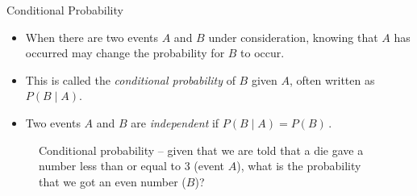 \documentclass[serif,envcountsect,table,t%
]{beamer}%
\begin{document}
\begin{frame}{Conditional Probability}
  \begin{itemize}
  \item When there are two events $A$ and $B$ under consideration, knowing that
    $A$ has occurred may change the probability for $B$ to occur.
  \item This is called the \emph{conditional probability} of $B$ given $A$,
    often written as $P(B\mid A)$.
  \item Two events $A$ and $B$ are \emph{independent} if $P(B\mid A) = P(B)\,.$
\end{itemize}
   


\begin{figure}[htbp]
\centering
{}
\caption{Conditional probability -- given that we are told that a die gave a number less than or equal to 3 (event $A$), what is the probability that we got an even number ($B$)?}
\label{fig:probability-conditional}
\end{figure}

\end{frame}
\end{document}
